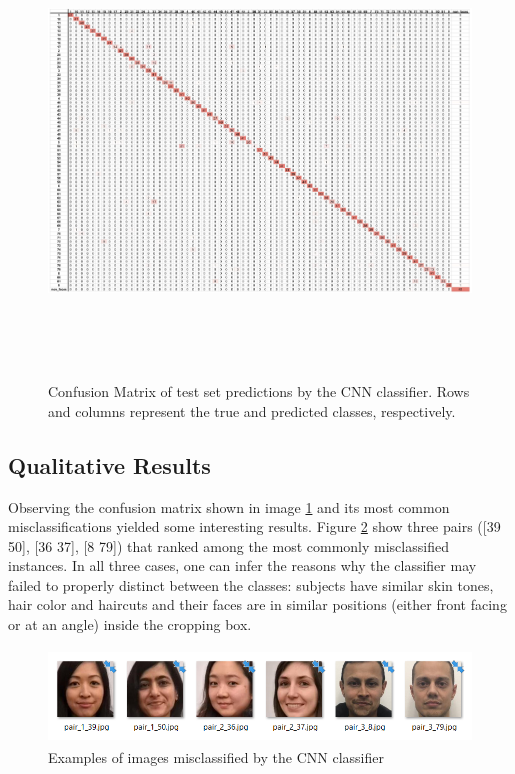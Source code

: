 \documentclass[11pt]{article}
\begin{document}
        \begin{figure}[!h]
            \centering
            \includegraphics[height=12cm]{./Images/results/confusion_matrix.png}
            \caption{Confusion Matrix of test set predictions by the CNN classifier. Rows and columns represent the true and predicted classes, respectively.}
            \label{fig:results:confusion_matrix}
        \end{figure}

    \subsection{Qualitative Results}
        Observing the confusion matrix shown in image \ref{fig:results:confusion_matrix} and its most common misclassifications yielded some interesting results. Figure \ref{fig:results:confusion_samples} show three pairs ([39 50], [36 37],  [8 79]) that ranked among the most commonly misclassified instances. In all three cases, one can infer the reasons why the classifier may failed to properly distinct between the classes: subjects have similar skin tones, hair color and haircuts and their faces are in similar positions (either front facing or at an angle) inside the cropping box.

        \begin{figure}[h]
            \centering
            \includegraphics[height=2.5cm]{./Images/results/confusion_samples_2.png}
            \caption{Examples of images misclassified by the CNN classifier}
            \label{fig:results:confusion_samples}
        \end{figure}
\end{document}

